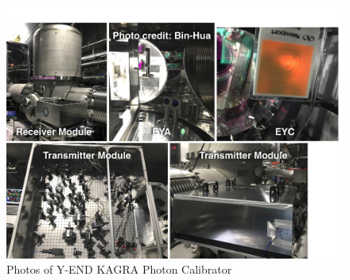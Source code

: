 \begin{figure}[hbt!]
\centering
\includegraphics[width=1\textwidth]{figure/pcal/pcal_photo.pdf}
\caption[Photos of Y-END KAGRA Photon Calibrator]{Photos of Y-END KAGRA Photon Calibrator  }
\label{fig:pcal_photo}
\end{figure}
 

